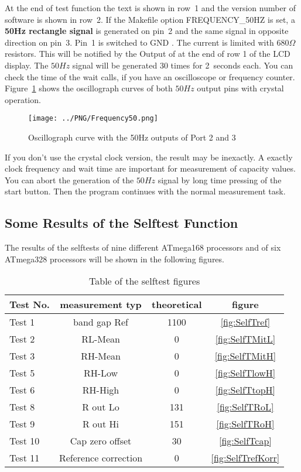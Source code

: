 At the end of test function the text   is shown in row~1 and the version number of software is shown in row~2.
If the Makefile option FREQUENCY\_50HZ is set, a \textbf {50Hz rectangle signal} is generated on pin~2 and 
the same signal in opposite direction on pin~3.
Pin~1 is switched to GND . The current is limited with \(680\Omega\) resistors.
This will be notified by the Output of  at the end of row 1 of the LCD display.
The \(50Hz\) signal will be generated 30 times for 2~seconds each.
You can check the time of the wait calls, if you have an oscilloscope or frequency counter.
Figure~\ref{fig:Frequency50} shows the oscillograph curves of both \(50Hz\) output pins with crystal operation.

\begin{figure}[H]
\centering
\texttt{[image: ../PNG/Frequency50.png]}
\caption{Oscillograph curve with the 50Hz outputs of Port 2 and 3}
\label{fig:Frequency50}
\end{figure}


If you don't use the crystal clock version, the result may be inexactly.
A exactly clock frequency and wait time are important for measurement of capacity values.
You can abort the generation of the \(50Hz\) signal by long time pressing of the start button.
Then the program continues with the normal measurement task.

\subsection{Some Results of the Selftest Function}

The results of the selftests of nine different ATmega168 processors and of six ATmega328 processors
will be shown in the following figures.

\begin{table}[H]
  \begin{center}
    \begin{tabular}{| l | c | c | c |}
    \hline
Test No. & measurement typ & theoretical & figure \\
    \hline
    \hline
Test 1 & band gap Ref  & 1100 & \ref{fig:SelfTref} \\
    \hline
Test 2 & RL-Mean & 0 & \ref{fig:SelfTMitL} \\
    \hline
Test 3 & RH-Mean & 0 & \ref{fig:SelfTMitH} \\
    \hline
Test 5 & RH-Low &  0 & \ref{fig:SelfTlowH} \\
    \hline
Test 6 & RH-High & 0 & \ref{fig:SelfTtopH} \\
    \hline
Test 8 & R out Lo & 131 & \ref{fig:SelfTRoL} \\
    \hline
Test 9 & R out Hi & 151 & \ref{fig:SelfTRoH} \\
    \hline
Test 10 & Cap zero offset & 30 & \ref{fig:SelfTcap} \\
    \hline
Test 11 & Reference correction & 0 & \ref{fig:SelfTrefKorr} \\
    \hline
    \end{tabular}
  \end{center}
  \caption{Table of the selftest figures }
  \label{tab:test_m168} 
\end{table}


